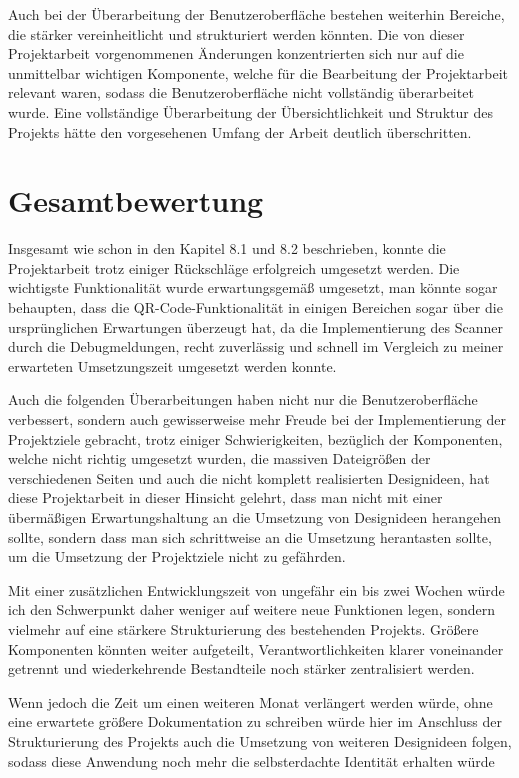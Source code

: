 ﻿\documentclass[oneside]{ausarbeitung}
\begin{document}
Auch bei der Überarbeitung der Benutzeroberfläche bestehen weiterhin Bereiche, die stärker vereinheitlicht und strukturiert werden könnten.
Die von dieser Projektarbeit vorgenommenen Änderungen konzentrierten sich nur auf die unmittelbar wichtigen Komponente, welche für die Bearbeitung 
der Projektarbeit relevant waren, sodass die Benutzeroberfläche nicht vollständig überarbeitet wurde. Eine vollständige Überarbeitung der 
Übersichtlichkeit und Struktur des Projekts hätte den vorgesehenen Umfang der Arbeit deutlich überschritten.


\section{Gesamtbewertung}
\label{sec:gesamtbewertung}

Insgesamt wie schon in den Kapitel 8.1 und 8.2 beschrieben, konnte die Projektarbeit trotz einiger Rückschläge erfolgreich umgesetzt werden.
Die wichtigste Funktionalität wurde erwartungsgemäß umgesetzt, man könnte sogar behaupten, dass die QR-Code-Funktionalität in einigen Bereichen
sogar über die ursprünglichen Erwartungen überzeugt hat, da die Implementierung des Scanner durch die Debugmeldungen, recht zuverlässig und schnell
im Vergleich zu meiner erwarteten Umsetzungszeit umgesetzt werden konnte.

Auch die folgenden Überarbeitungen haben nicht nur die Benutzeroberfläche verbessert, sondern auch gewisserweise mehr Freude bei der 
Implementierung der Projektziele gebracht, trotz einiger Schwierigkeiten, bezüglich der Komponenten, welche nicht richtig umgesetzt wurden, die massiven 
Dateigrößen der verschiedenen Seiten und auch die nicht komplett realisierten Designideen, hat diese Projektarbeit in dieser Hinsicht gelehrt, dass
man nicht mit einer übermäßigen Erwartungshaltung an die Umsetzung von Designideen herangehen sollte, sondern dass man sich schrittweise an
die Umsetzung herantasten sollte, um die Umsetzung der Projektziele nicht zu gefährden.

Mit einer zusätzlichen Entwicklungszeit von ungefähr ein bis zwei Wochen würde ich den Schwerpunkt daher weniger auf weitere neue Funktionen legen,
sondern vielmehr auf eine stärkere Strukturierung des bestehenden Projekts. Größere Komponenten könnten weiter aufgeteilt, Verantwortlichkeiten klarer
voneinander getrennt und wiederkehrende Bestandteile noch stärker zentralisiert werden.

Wenn jedoch die Zeit um einen weiteren Monat verlängert werden würde, ohne eine erwartete größere Dokumentation zu schreiben würde hier im Anschluss
der Strukturierung des Projekts auch die Umsetzung von weiteren Designideen folgen, sodass diese Anwendung noch mehr die selbsterdachte
Identität erhalten würde
\end{document}
